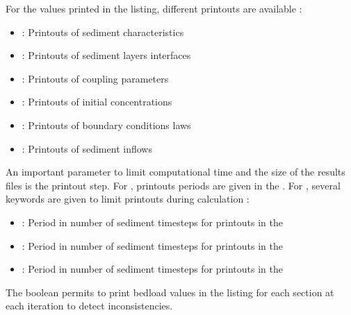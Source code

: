 For the values printed in the listing, different printouts are available :

\begin{itemize}
	\item {} : Printouts of sediment characteristics
	\item {} : Printouts of sediment layers interfaces
	\item {} : Printouts of coupling parameters
	\item {} : Printouts of initial concentrations
	\item {} : Printouts of boundary conditions laws
	\item {} : Printouts of sediment inflows
\end{itemize}

An important parameter to limit computational time and the size of the results files is the printout step. For \mascaret, printouts periods are given in the \xcas. For \courlis, several keywords are given to limit printouts during calculation :

\begin{itemize}
	\item {} : Period in number of sediment timesteps for \courlis printouts in the 
	\item {} : Period in number of sediment timesteps for \courlis printouts in the 
	\item {} : Period in number of sediment timesteps for \courlis printouts in the 
\end{itemize}

The boolean  permits to print bedload values in the listing for each section at each iteration to detect inconsistencies.
